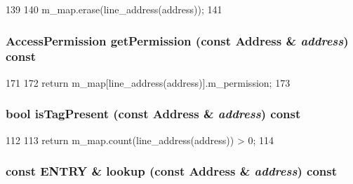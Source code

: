 \begin{DoxyCode}
139 {
140     m_map.erase(line_address(address));
141 }
\end{DoxyCode}
\hypertarget{classPerfectCacheMemory_a1d0a7a05b5c02321c48531693e017b60}{
\subsubsection[{getPermission}]{\setlength{\rightskip}{0pt plus 5cm}AccessPermission getPermission (const {\bf Address} \& {\em address}) const}}
\label{classPerfectCacheMemory_a1d0a7a05b5c02321c48531693e017b60}



\begin{DoxyCode}
171 {
172     return m_map[line_address(address)].m_permission;
173 }
\end{DoxyCode}
\hypertarget{classPerfectCacheMemory_a38231bf6d0b58d2b0319faa5af3135ca}{
\subsubsection[{isTagPresent}]{\setlength{\rightskip}{0pt plus 5cm}bool isTagPresent (const {\bf Address} \& {\em address}) const}}
\label{classPerfectCacheMemory_a38231bf6d0b58d2b0319faa5af3135ca}



\begin{DoxyCode}
112 {
113     return m_map.count(line_address(address)) > 0;
114 }
\end{DoxyCode}
\hypertarget{classPerfectCacheMemory_ae4eedfdf4c0d37e8720fbc7e92b55cdf}{
\subsubsection[{lookup}]{\setlength{\rightskip}{0pt plus 5cm}const ENTRY \& lookup (const {\bf Address} \& {\em address}) const}}
\label{classPerfectCacheMemory_ae4eedfdf4c0d37e8720fbc7e92b55cdf}



